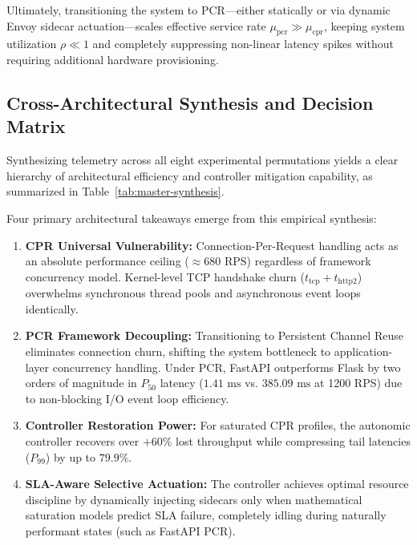 \documentclass{ieeeaccess}
\begin{document}
	Ultimately, transitioning the system to PCR—either statically or via dynamic Envoy sidecar actuation—scales effective service rate $\mu_{\text{pcr}} \gg \mu_{\text{cpr}}$, keeping system utilization $\rho \ll 1$ and completely suppressing non-linear latency spikes without requiring additional hardware provisioning.
	
	
	\subsection{Cross-Architectural Synthesis and Decision Matrix}
	\label{sec5.5_synthesis}
	
	Synthesizing telemetry across all eight experimental permutations yields a clear hierarchy of architectural efficiency and controller mitigation capability, as summarized in Table~\ref{tab:master-synthesis}.
	
	Four primary architectural takeaways emerge from this empirical synthesis:
	\begin{enumerate}
		\item \textbf{CPR Universal Vulnerability:} Connection-Per-Request handling acts as an absolute performance ceiling ($\approx 680\text{ RPS}$) regardless of framework concurrency model. Kernel-level TCP handshake churn ($t_{\text{tcp}} + t_{\text{http2}}$) overwhelms synchronous thread pools and asynchronous event loops identically.
		\item \textbf{PCR Framework Decoupling:} Transitioning to Persistent Channel Reuse eliminates connection churn, shifting the system bottleneck to application-layer concurrency handling. Under PCR, FastAPI outperforms Flask by two orders of magnitude in $P_{50}$ latency ($1.41\text{ ms}$ vs. $385.09\text{ ms}$ at 1200 RPS) due to non-blocking I/O event loop efficiency.
		\item \textbf{Controller Restoration Power:} For saturated CPR profiles, the autonomic controller recovers over $+60\%$ lost throughput while compressing tail latencies ($P_{99}$) by up to $79.9\%$.
		\item \textbf{SLA-Aware Selective Actuation:} The controller achieves optimal resource discipline by dynamically injecting sidecars only when mathematical saturation models predict SLA failure, completely idling during naturally performant states (such as FastAPI PCR).
	\end{enumerate}
	
	
	
	
\end{document}

